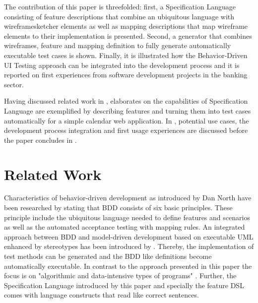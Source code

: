 \documentclass{sig-alternate-05-2015}
\begin{document}
The contribution of this paper is threefolded:
first, a Specification Language consisting of feature descriptions that combine an ubiquitous language with wireframesketcher elements \cite{Wireframesketcher} as well as mapping descriptions that map wireframe elements to their implementation is presented.
Second, a generator that combines wireframes, feature and mapping definition to fully generate automatically executable test cases is shown.
Finally, it is illustrated how the Behavior-Driven UI Testing approach can be integrated into the development process and it is reported on first experiences from software development projects in the banking sector.

Having discussed related work in ,  elaborates on the capabilities of Specification Language are exemplified by describing features and turning them into test cases automatically for a simple calendar web application.
In , potential use cases, the development process integration and first usage experiences are discussed before the paper concludes in .


\section{Related Work}\label{sec:RelatedWork}
Characteristics of behavior-driven development as introduced by Dan North \cite{DanNorth} have been researched by \cite{C.Solis.2011} stating that BDD consists of six basic principles.
These principle include the ubiquitous language needed to define features and scenarios as well as the automated acceptance testing with mapping rules.
An integrated approach between BDD and model-driven development based on executable UML enhanced by stereotypes has been introduced by \cite{IoanLazar.2010}.
Thereby, the implementation of test methods can be generated and the BDD like definitions become automatically executable.
In contrast to the approach presented in this paper the focus is on "algorithmic and data-intensive types of programs" \cite{IoanLazar.2010}.
Further, the Specification Language introduced by this paper and specially the feature DSL comes with language constructs that read like correct sentences.
\end{document}
